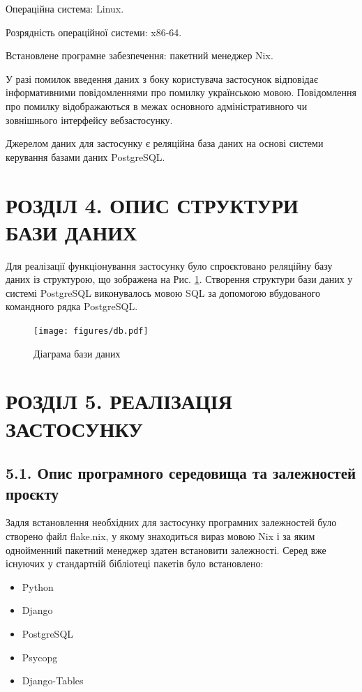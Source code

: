 \documentclass[a4paper, 14pt]{extarticle}
\begin{document}
  Операційна система: Linux.

  Розрядність операційної системи: x86-64.

  Встановлене програмне забезпечення: пакетний менеджер Nix.

  У разі помилок введення даних з боку користувача застосунок відповідає інформативними
  повідомленнями про помилку українською мовою. Повідомлення про помилку
  відображаються в межах основного адміністративного чи зовнішнього інтерфейсу вебзастосунку.

  Джерелом даних для застосунку є реляційна база даних на основі системи керування
  базами даних PostgreSQL.
  
  \clearpage
  \section{РОЗДІЛ 4. ОПИС СТРУКТУРИ БАЗИ ДАНИХ}
  Для реалізації функціонування застосунку було спроєктовано реляційну базу
  даних із структурою, що зображена на Рис. \ref{db}. Створення структури
  бази даних у системі PostgreSQL виконувалось мовою SQL за допомогою вбудованого
  командного рядка PostgreSQL.

  \begin{figure}[h]
    \texttt{[image: figures/db.pdf]}
    \centering
    \caption{Діаграма бази даних}
    \label{db}
  \end{figure}

  \clearpage
  \section{РОЗДІЛ 5. РЕАЛІЗАЦІЯ ЗАСТОСУНКУ}
  \subsection{5.1. Опис програмного середовища та залежностей проєкту}
  Задля встановлення необхідних для застосунку програмних залежностей було
  створено файл flake.nix, у якому знаходиться вираз мовою Nix і за яким
  однойменний пакетний менеджер здатен встановити залежності. Серед вже
  існуючих у стандартній бібліотеці пакетів було встановлено:

  \begin{itemize}[nosep]
    \item Python
    \item Django
    \item PostgreSQL
    \item Psycopg
    \item Django-Tables
  \end{itemize}
\end{document}
